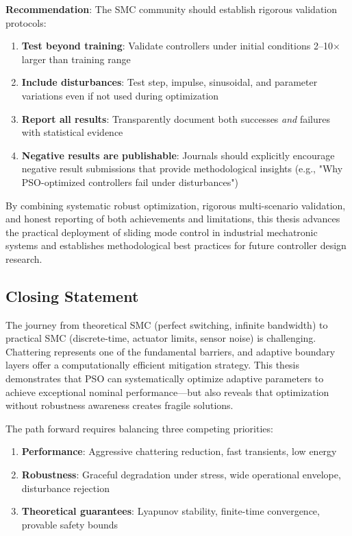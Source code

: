 \textbf{Recommendation}: The SMC community should establish rigorous validation protocols:
\begin{enumerate}
    \item \textbf{Test beyond training}: Validate controllers under initial conditions 2--10$\times$ larger than training range
    \item \textbf{Include disturbances}: Test step, impulse, sinusoidal, and parameter variations even if not used during optimization
    \item \textbf{Report all results}: Transparently document both successes \textit{and} failures with statistical evidence
    \item \textbf{Negative results are publishable}: Journals should explicitly encourage negative result submissions that provide methodological insights (e.g., "Why PSO-optimized controllers fail under disturbances")
\end{enumerate}

By combining systematic robust optimization, rigorous multi-scenario validation, and honest reporting of both achievements and limitations, this thesis advances the practical deployment of sliding mode control in industrial mechatronic systems and establishes methodological best practices for future controller design research.

\subsection{Closing Statement}

The journey from theoretical SMC (perfect switching, infinite bandwidth) to practical SMC (discrete-time, actuator limits, sensor noise) is challenging. Chattering represents one of the fundamental barriers, and adaptive boundary layers offer a computationally efficient mitigation strategy. This thesis demonstrates that PSO can systematically optimize adaptive parameters to achieve exceptional nominal performance—but also reveals that optimization without robustness awareness creates fragile solutions.

The path forward requires balancing three competing priorities:
\begin{enumerate}
    \item \textbf{Performance}: Aggressive chattering reduction, fast transients, low energy
    \item \textbf{Robustness}: Graceful degradation under stress, wide operational envelope, disturbance rejection
    \item \textbf{Theoretical guarantees}: Lyapunov stability, finite-time convergence, provable safety bounds
\end{enumerate}

